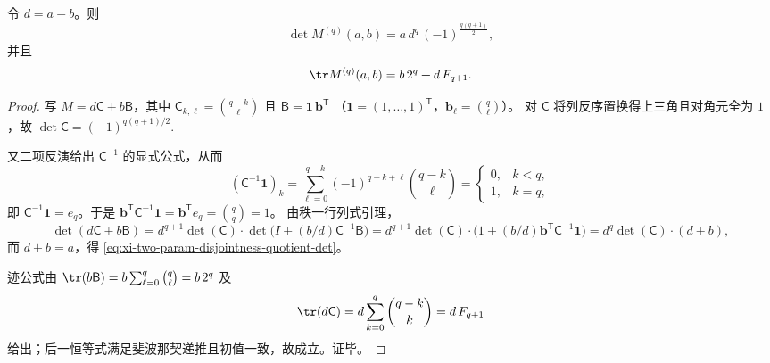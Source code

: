 \begin{theorem}\label{thm:xi-two-param-disjointness-quotient-det-trace}
令 \(d=a-b\)。则
\begin{equation}\label{eq:xi-two-param-disjointness-quotient-det}
\det M^{(q)}(a,b)=a\,d^{q}\,(-1)^{\frac{q(q+1)}{2}},
\end{equation}
并且
\begin{equation}\label{eq:xi-two-param-disjointness-quotient-trace}
\tr M^{(q)}(a,b)=b\,2^q+d\,F_{q+1}.
\end{equation}
\end{theorem}
\begin{proof}
写 \(M=d\mathsf C+b\mathsf B\)，其中
\(
\mathsf C_{k,\ell}=\binom{q-k}{\ell}
\)
且
\(
\mathsf B=\mathbf 1\,\mathbf b^{\mathsf T}
\)
（\(\mathbf 1=(1,\dots,1)^{\mathsf T}\)，\(\mathbf b_\ell=\binom{q}{\ell}\)）。
对 \(\mathsf C\) 将列反序置换得上三角且对角元全为 \(1\)，故
\(
\det\mathsf C=(-1)^{q(q+1)/2}.
\)
\par
又二项反演给出 \(\mathsf C^{-1}\) 的显式公式，从而
\[
(\mathsf C^{-1}\mathbf 1)_k=\sum_{\ell=0}^{q-k}(-1)^{q-k+\ell}\binom{q-k}{\ell}=
\begin{cases}
0,&k<q,\\
1,&k=q,
\end{cases}
\]
即 \(\mathsf C^{-1}\mathbf 1=e_q\)。于是 \(\mathbf b^{\mathsf T}\mathsf C^{-1}\mathbf 1=\mathbf b^{\mathsf T}e_q=\binom{q}{q}=1\)。
由秩一行列式引理，
\[
\det(d\mathsf C+b\mathsf B)
=d^{q+1}\det(\mathsf C)\cdot\det\bigl(I+(b/d)\mathsf C^{-1}\mathsf B\bigr)
=d^{q+1}\det(\mathsf C)\cdot\bigl(1+(b/d)\mathbf b^{\mathsf T}\mathsf C^{-1}\mathbf 1\bigr)
=d^q\det(\mathsf C)\cdot(d+b),
\]
而 \(d+b=a\)，得 \eqref{eq:xi-two-param-disjointness-quotient-det}。
\par
迹公式由
\(
\tr(b\mathsf B)=b\sum_{\ell=0}^q\binom{q}{\ell}=b\,2^q
\)
及
\[
\tr(d\mathsf C)=d\sum_{k=0}^q\binom{q-k}{k}=d\,F_{q+1}
\]
给出；后一恒等式满足斐波那契递推且初值一致，故成立。证毕。
\end{proof}

